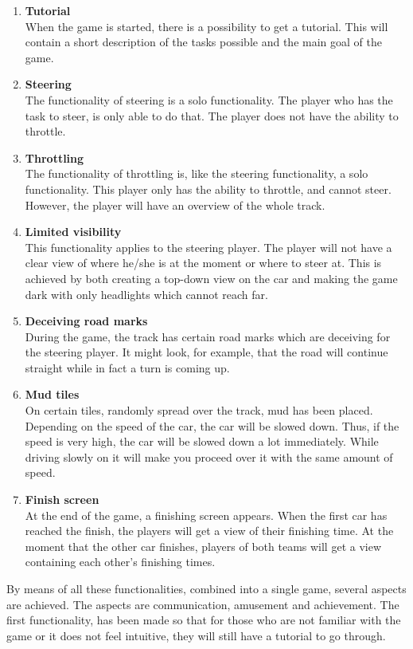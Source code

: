 \documentclass[11pt,twoside,a4paper]{article}
\begin{document}
\begin{enumerate}
\item \textbf{Tutorial} \\
When the game is started, there is a possibility to get a tutorial. This will contain a short description of the tasks possible and the main goal of the game.
\item \textbf{Steering} \\
The functionality of steering is a solo functionality. The player who has the task to steer, is only able to do that. The player does not have the ability to throttle.
\item \textbf{Throttling} \\
The functionality of throttling is, like the steering functionality, a solo functionality. This player only has the ability to throttle, and cannot steer. However, the player will have an overview of the whole track.
\item \textbf{Limited visibility} \\
This functionality applies to the steering player. The player will not have a clear view of where he/she is at the moment or where to steer at. This is achieved by both creating a top-down view on the car and making the game dark with only headlights which cannot reach far.
\item \textbf{Deceiving road marks} \\
During the game, the track has certain road marks which are deceiving for the steering player. It might look, for example, that the road will continue straight while in fact a turn is coming up.
\item \textbf{Mud tiles} \\
On certain tiles, randomly spread over the track, mud has been placed. Depending on the speed of the car, the car will be slowed down. Thus, if the speed is very high, the car will be slowed down a lot immediately. While driving slowly on it will make you proceed over it with the same amount of speed.
\item \textbf{Finish screen} \\
At the end of the game, a finishing screen appears. When the first car has reached the finish, the players will get a view of their finishing time. At the moment that the other car finishes, players of both teams will get a view containing each other’s finishing times.
\end{enumerate}

\clearpage

By means of all these functionalities, combined into a single game, several aspects are achieved. The aspects are communication, amusement and achievement.
The first functionality, has been made so that for those who are not familiar with the game or it does not feel intuitive, they will still have a tutorial to go through. \\
\end{document}
